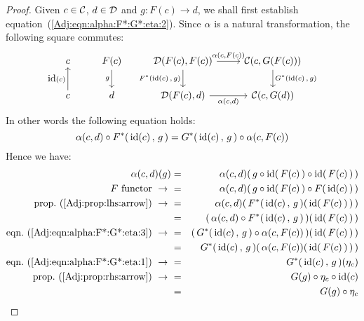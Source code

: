 \noindent
\begin{proof}
    Given $c\in\mbox{$\cal C$}$, $d\in\mbox{$\cal D$}$ and $g:F(c)\to d$, we shall first establish 
    equation~(\ref{Adj:eqn:alpha:F*:G*:eta:2}). Since $\alpha$
    is a natural transformation, the following square commutes:
        \[
            \begin{tikzcd}
                c
                &F(c)\arrow[d,swap, "g"]
                &\Dat(F(c),F(c))\arrow[r, "\alpha\mbox{$(c,F(c))$}"]
                \arrow[d, swap,"F^{*}\mbox{$({\rm id}(c)\,,\,g)$}"]
                &\Cat(c,G(F(c)))
                \arrow[d, "G^{*}\mbox{$({\rm id}(c)\,,\,g)$}"]
                \\
                c\arrow[u, "\id(c)"]
                &d
                &\Dat(F(c),d)\arrow[r, swap, "\alpha\mbox{$(c,d)$}"]
                &\Cat(c,G(d))
            \end{tikzcd}
        \]
    In other words the following equation holds: 
        \begin{equation}\label{Adj:eqn:alpha:F*:G*:eta:3}
            \alpha(c,d)\circ F^{*}(\,\mbox{\rm id}(c)\,,\,g\,) = 
            G^{*}(\,\mbox{\rm id}(c)\,,\,g\,)\circ\alpha(c,F(c))
        \end{equation}
    Hence we have:
        \begin{eqnarray*}\alpha(c,d)(g)
            &=&\alpha(c,d)(\,g\circ\id(\,F(c)\,)\circ\id(\,F(c)\,)\,)\\
            \mbox{$F$ functor}\ \to\ 
            &=&\alpha(c,d)(\,g\circ\id(\,F(c)\,)\circ F(\,\id(c)\,)\,)\\
            \mbox{prop.~(\ref{Adj:prop:lhs:arrow})}\ \to\ 
            &=&\alpha(c,d)(\,F^{*}(\,\id(c)\,,\,g\,)(\,\id(\,F(c)\,)\,)\,)\\
            &=&(\,\alpha(c,d)\circ F^{*}(\,\id(c)\,,\,g\,)\,)(\,\id(\,F(c)\,)\,)\\
            \mbox{eqn.~(\ref{Adj:eqn:alpha:F*:G*:eta:3})}\ \to\ 
            &=&(\,G^{*}(\,\id(c)\,,\,g\,)\circ\alpha(c,F(c))\,)(\,\id(\,F(c)\,)\,)\\
            &=&G^{*}(\,\id(c)\,,\,g\,)(\,\alpha(c,F(c))(\,\id(\,F(c)\,)\,)\,)\\
            \mbox{eqn.~(\ref{Adj:eqn:alpha:F*:G*:eta:1})}\ \to\ 
            &=&G^{*}(\,\id(c)\,,\,g\,)(\eta_{c})\\
            \mbox{prop.~(\ref{Adj:prop:rhs:arrow})}\ \to\ 
            &=&G(g)\circ\eta_{c}\circ\id(c)\\
            &=&G(g)\circ\eta_{c}\\
        \end{eqnarray*}

\end{proof}
